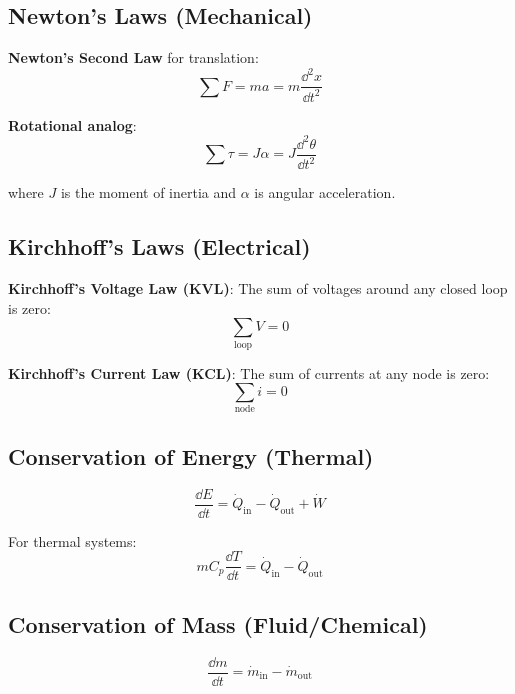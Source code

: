 \subsection{Newton's Laws (Mechanical)}

\textbf{Newton's Second Law} for translation:
\begin{equation}
\sum F = ma = m\frac{\dd^2 x}{\dd t^2}
\end{equation}

\textbf{Rotational analog}:
\begin{equation}
\sum \tau = J\alpha = J\frac{\dd^2 \theta}{\dd t^2}
\end{equation}

where $J$ is the moment of inertia and $\alpha$ is angular acceleration.

\subsection{Kirchhoff's Laws (Electrical)}

\textbf{Kirchhoff's Voltage Law (KVL)}: The sum of voltages around any closed loop is zero:
\begin{equation}
\sum_{\text{loop}} V = 0
\end{equation}

\textbf{Kirchhoff's Current Law (KCL)}: The sum of currents at any node is zero:
\begin{equation}
\sum_{\text{node}} i = 0
\end{equation}

\subsection{Conservation of Energy (Thermal)}

\begin{equation}
\frac{\dd E}{\dd t} = \dot{Q}_{\text{in}} - \dot{Q}_{\text{out}} + \dot{W}
\end{equation}

For thermal systems:
\begin{equation}
mC_p\frac{\dd T}{\dd t} = \dot{Q}_{\text{in}} - \dot{Q}_{\text{out}}
\end{equation}

\subsection{Conservation of Mass (Fluid/Chemical)}

\begin{equation}
\frac{\dd m}{\dd t} = \dot{m}_{\text{in}} - \dot{m}_{\text{out}}
\end{equation}

